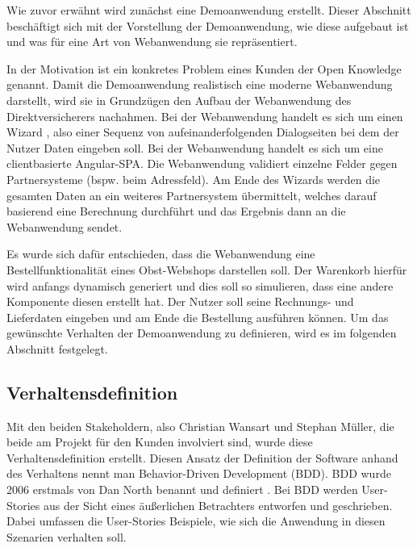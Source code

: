 
Wie zuvor erwähnt wird zunächst eine Demoanwendung erstellt. Dieser Abschnitt beschäftigt sich mit der Vorstellung der Demoanwendung, wie diese aufgebaut ist und was für eine Art von Webanwendung sie repräsentiert.

In der Motivation ist ein konkretes Problem eines Kunden der Open Knowledge genannt. Damit die Demoanwendung realistisch eine moderne Webanwendung \cite{RichWebBasedApplications} darstellt, wird sie in Grundzügen den Aufbau der Webanwendung des Direktversicherers nachahmen. Bei der Webanwendung handelt es sich um einen Wizard \cite{EzMolAWebServerWizard}, also einer Sequenz von aufeinanderfolgenden Dialogseiten bei dem der Nutzer Daten eingeben soll. Bei der Webanwendung handelt es sich um eine clientbasierte Angular-SPA. Die Webanwendung validiert einzelne Felder gegen Partnersysteme (bspw. beim Adressfeld). Am Ende des Wizards werden die gesamten Daten an ein weiteres Partnersystem übermittelt, welches darauf basierend eine Berechnung durchführt und das Ergebnis dann an die Webanwendung sendet.

Es wurde sich dafür entschieden, dass die Webanwendung eine Bestellfunktionalität eines Obst-Webshops darstellen soll. Der Warenkorb hierfür wird anfangs dynamisch generiert und dies soll so simulieren, dass eine andere Komponente diesen erstellt hat. Der Nutzer soll seine Rechnungs- und Lieferdaten eingeben und am Ende die Bestellung ausführen können. Um das gewünschte Verhalten der Demoanwendung zu definieren, wird es im folgenden Abschnitt festgelegt.

\subsection{Verhaltensdefinition}

Mit den beiden Stakeholdern, also Christian Wansart und Stephan Müller, die beide am Projekt für den Kunden involviert sind, wurde diese Verhaltensdefinition erstellt. Diesen Ansatz der Definition der Software anhand des Verhaltens nennt man Behavior-Driven Development (BDD). BDD wurde 2006 erstmals von Dan North benannt und definiert \cite{IntroducingBDD}. Bei BDD werden User-Stories aus der Sicht eines äußerlichen Betrachters entworfen und geschrieben. Dabei umfassen die User-Stories Beispiele, wie sich die Anwendung in diesen Szenarien verhalten soll.


